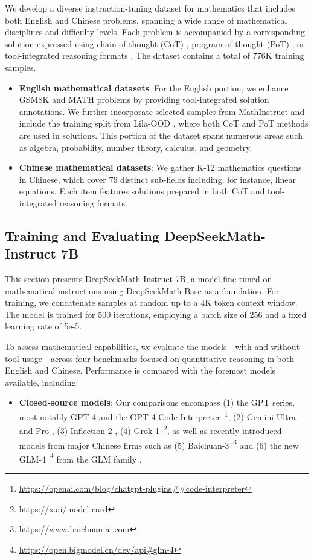We develop a diverse instruction-tuning dataset for mathematics that includes both English and Chinese problems, spanning a wide range of mathematical disciplines and difficulty levels. Each problem is accompanied by a corresponding solution expressed using chain-of-thought (CoT) \citep{cot}, program-of-thought (PoT) \citep{pot,pal}, or tool-integrated reasoning formats \citep{tora}. The dataset contains a total of 776K training samples.

\begin{itemize}[topsep=0pt]
    \item \textbf{English mathematical datasets}: For the English portion, we enhance GSM8K and MATH problems by providing tool-integrated solution annotations. We further incorporate selected samples from MathInstruct \citep{MathInstruct} and include the training split from Lila-OOD \citep{lila}, where both CoT and PoT methods are used in solutions. This portion of the dataset spans numerous areas such as algebra, probability, number theory, calculus, and geometry.
    \item \textbf{Chinese mathematical datasets}: We gather K-12 mathematics questions in Chinese, which cover 76 distinct sub-fields including, for instance, linear equations. Each item features solutions prepared in both CoT and tool-integrated reasoning formats.
\end{itemize}

\subsection{Training and Evaluating DeepSeekMath-Instruct 7B}

This section presents DeepSeekMath-Instruct 7B, a model fine-tuned on mathematical instructions using DeepSeekMath-Base as a foundation. For training, we concatenate samples at random up to a 4K token context window. The model is trained for 500 iterations, employing a batch size of 256 and a fixed learning rate of 5e-5.

To assess mathematical capabilities, we evaluate the models—with and without tool usage—across four benchmarks focused on quantitative reasoning in both English and Chinese. Performance is compared with the foremost models available, including:

\begin{itemize}[topsep=0pt]
    \item \textbf{Closed-source models}: Our comparisons encompass (1) the GPT series, most notably GPT-4 \citep{gpt4} and the GPT-4 Code Interpreter~\footnote{\url{https://openai.com/blog/chatgpt-plugins\#\#code-interpreter}}, (2) Gemini Ultra and Pro \citep{gemini}, (3) Inflection-2 \citep{inflection-2}, (4) Grok-1~\footnote{\url{https://x.ai/model-card}}, as well as recently introduced models from major Chinese firms such as (5) Baichuan-3~\footnote{\url{https://www.baichuan-ai.com}} and (6) the new GLM-4~\footnote{\url{https://open.bigmodel.cn/dev/api\#glm-4}} from the GLM family \citep{glm}.
\end{itemize}

